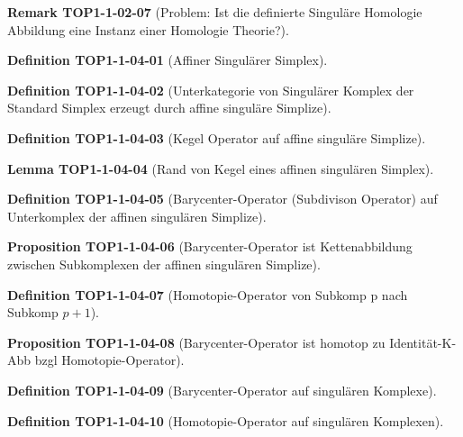 \documentclass[10pt, letterpaper]{article}
\newcommand{\CustomHeading}[3]{%
  \par\medskip\noindent%
  \textbf{#1 #2} \textnormal{(#3)}.\enskip%
}
\newenvironment{DEF}[2]{\CustomHeading{Definition}{#1}{#2}}{}
\newenvironment{PROP}[2]{\CustomHeading{Proposition}{#1}{#2}}{}
\newenvironment{LEM}[2]{\CustomHeading{Lemma}{#1}{#2}}{}
\newenvironment{REM}[2]{\CustomHeading{Remark}{#1}{#2}}{}
\begin{document}
\begin{REM}{TOP1-1-02-07}{Problem: Ist die definierte Singuläre Homologie Abbildung eine Instanz einer Homologie Theorie?}
\end{REM}

\begin{DEF}{TOP1-1-04-01}{Affiner Singulärer Simplex}
\end{DEF}

\begin{DEF}{TOP1-1-04-02}{Unterkategorie von Singulärer Komplex der Standard Simplex erzeugt durch affine singuläre Simplize}
\end{DEF}

\begin{DEF}{TOP1-1-04-03}{Kegel Operator auf affine singuläre Simplize}
\end{DEF}

\begin{LEM}{TOP1-1-04-04}{Rand von Kegel eines affinen singulären Simplex}
\end{LEM}

\begin{DEF}{TOP1-1-04-05}{Barycenter-Operator (Subdivison Operator) auf Unterkomplex der affinen singulären Simplize}
\end{DEF}

\begin{PROP}{TOP1-1-04-06}{Barycenter-Operator ist Kettenabbildung zwischen Subkomplexen der affinen singulären Simplize}
\end{PROP}

\begin{DEF}{TOP1-1-04-07}{Homotopie-Operator von Subkomp p nach Subkomp $p+1$}
\end{DEF}

\begin{PROP}{TOP1-1-04-08}{Barycenter-Operator ist homotop zu Identität-K-Abb bzgl Homotopie-Operator}
\end{PROP}

\begin{DEF}{TOP1-1-04-09}{Barycenter-Operator auf singulären Komplexe}
\end{DEF}

\begin{DEF}{TOP1-1-04-10}{Homotopie-Operator auf singulären Komplexen}
\end{DEF}
\end{document}

